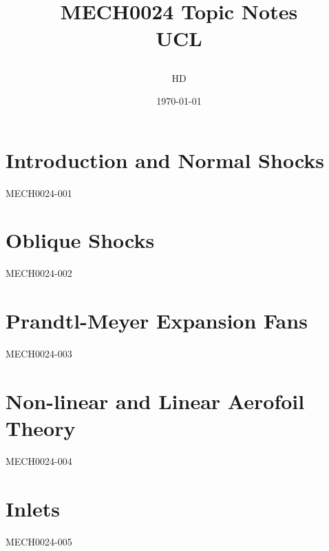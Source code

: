 \documentclass[12pt,a4paper, twoside]{report}
\begin{document}
\title{
{MECH0024 Topic Notes}\\
{\large UCL}
\author{HD}
\date{\today}
}
\maketitle
\tableofcontents
\chapter{Introduction and Normal Shocks}
{MECH0024-001}
\chapter{Oblique Shocks}
{MECH0024-002}
\chapter{Prandtl-Meyer Expansion Fans}
{MECH0024-003}
\chapter{Non-linear and Linear Aerofoil Theory}
{MECH0024-004}
\chapter{Inlets}
{MECH0024-005}
\end{document}
